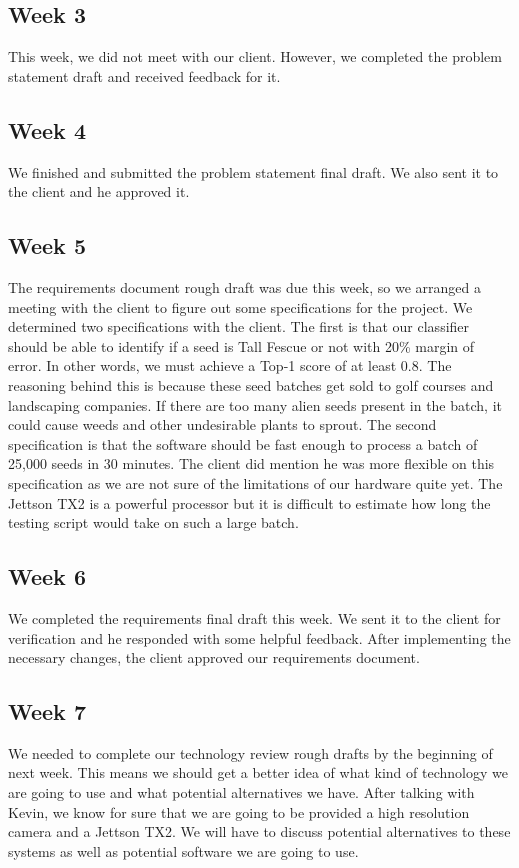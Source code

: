 \documentclass[onecolumn, draftclsnofoot,10pt, compsoc]{IEEEtran}
\begin{document}
	\subsection{Week 3}
	This week, we did not meet with our client. However, we completed the problem statement draft and received feedback for it. 
	\subsection{Week 4}
	We finished and submitted the problem statement final draft. We also sent it to the client and he approved it. 
	\subsection{Week 5}
	The requirements document rough draft was due this week, so we arranged a meeting with the client to figure out some specifications for the project. We determined two specifications with the client. The first is that our classifier should be able to identify if a seed is Tall Fescue or not with 20\% margin of error. In other words, we must achieve a Top-1 score of at least 0.8. The reasoning behind this is because these seed batches get sold to golf courses and landscaping companies. If there are too many alien seeds present in the batch, it could cause weeds and other undesirable plants to sprout. The second specification is that the software should be fast enough to process a batch of 25,000 seeds in 30 minutes. The client did mention he was more flexible on this specification as we are not sure of the limitations of our hardware quite yet. The Jettson TX2 is a powerful processor but it is difficult to estimate how long the testing script would take on such a large batch.
	\subsection{Week 6}
	We completed the requirements final draft this week. We sent it to the client for verification and he responded with some helpful feedback. After implementing the necessary changes, the client approved our requirements document.
	\subsection{Week 7}
	We needed to complete our technology review rough drafts by the beginning of next week. This means we should get a better idea of what kind of technology we are going to use and what potential alternatives we have. After talking with Kevin, we know for sure that we are going to be provided a high resolution camera and a Jettson TX2. We will have to discuss potential alternatives to these systems as well as potential software we are going to use. 
\end{document}
